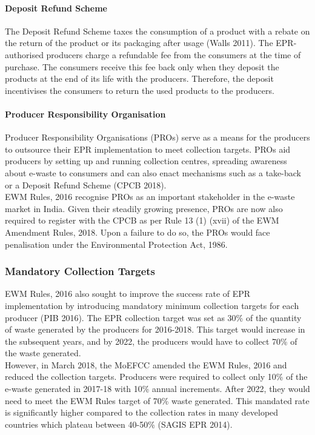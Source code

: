 \documentclass[a4paper, 12pt]{article}
\begin{document}
                    \paragraph{Deposit Refund Scheme}
                    
                    The Deposit Refund Scheme taxes the consumption of a product with a rebate on the return of the product or its packaging after usage (Walls 2011). The EPR-authorised producers charge a refundable fee from the consumers at the time of purchase. The consumers receive this fee back only when they deposit the products at the end of its life with the producers. Therefore, the deposit incentivises the consumers to return the used products to the producers. \\
                    
                    \paragraph{Producer Responsibility Organisation}
                    
                    Producer Responsibility Organisations (PROs) serve as a means for the producers to outsource their EPR implementation to meet collection targets. PROs aid producers by setting up and running collection centres, spreading awareness about e-waste to consumers and can also enact mechanisms such as a take-back or a Deposit Refund Scheme (CPCB 2018).\\
                    EWM Rules, 2016 recognise PROs as an important stakeholder in the e-waste market in India. Given their steadily growing presence, PROs are now also required to register with the CPCB as per Rule 13 (1) (xvii) of the EWM Amendment Rules, 2018. Upon a failure to do so, the PROs would face penalisation under the Environmental Protection Act, 1986.\\
                    
                    \subsubsection{Mandatory Collection Targets}
                    
                    EWM Rules, 2016 also sought to improve the success rate of EPR implementation by introducing mandatory minimum collection targets for each producer (PIB 2016). The EPR collection target was set as 30\% of the quantity of waste generated by the producers for 2016-2018. This target would increase in the subsequent years, and by 2022, the producers would have to collect 70\% of the waste generated.\\
                    However, in March 2018, the MoEFCC amended the EWM Rules, 2016 and reduced the collection targets. Producers were required to collect only 10\% of the e-waste generated in 2017-18 with 10\% annual increments. After 2022, they would need to meet the EWM Rules target of 70\% waste generated. This mandated rate is significantly higher compared to the collection rates in many developed countries which plateau between 40-50\% (SAGIS EPR 2014).  \\
                    
\end{document}
